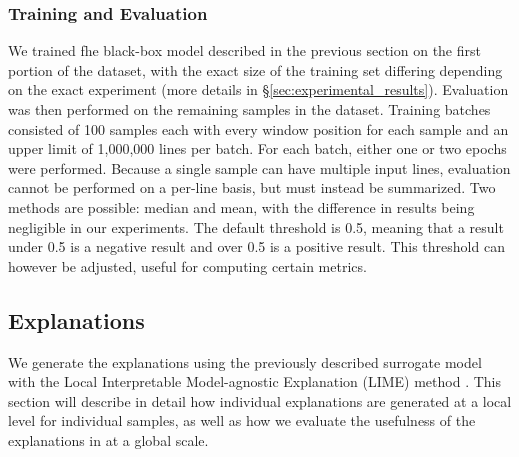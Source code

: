 \documentclass{article}
\begin{document}
			\subsubsection{Training and Evaluation}
			We trained fhe black-box model described in the previous section on the first portion
			of the dataset, with the exact size of the training set differing depending on the
			exact experiment (more details in §\ref{sec:experimental_results}). Evaluation was
			then performed on the remaining samples in the dataset. Training batches consisted of
			100 samples each with every window position for each sample and an upper limit of
			1,000,000 lines per batch. For each batch, either one or two epochs were performed.
			Because a single sample can have multiple input lines, evaluation cannot be performed
			on a per-line basis, but must instead be summarized. Two methods are possible: median
			and mean, with the difference in results being negligible in our experiments. The
			default threshold is 0.5, meaning that a result under 0.5 is a negative result and
			over 0.5 is a positive result. This threshold can however be adjusted, useful for
			computing certain metrics.
		\subsection{Explanations}
		\label{sec:method_exp}
		We generate the explanations using the previously described surrogate model with the Local
		Interpretable Model-agnostic Explanation (LIME) method \cite{ribeiro_why_2016}. This
		section will describe in detail how individual explanations are generated at a local level
		for individual samples, as well as how we evaluate the usefulness of the explanations in
		at a global scale.
\end{document}
